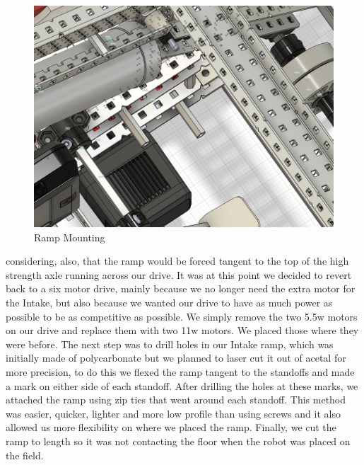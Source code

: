 \begin{figure}[H]
    \centering
    \includegraphics[width=0.5\linewidth]{images/tangentCAD.png}
    \caption{Ramp Mounting}
\end{figure}
considering, also, that the ramp would be forced tangent to the top of the high strength axle running across our drive. It was at this point we decided to revert back to a six motor drive, mainly because we no longer need the extra motor for the Intake, but also because we wanted our drive to have as much power as possible to be as competitive as possible. We simply remove the two 5.5w motors on our drive and replace them with two 11w motors. We placed those where they were before. The next step was to drill holes in our Intake ramp, which was initially made of polycarbonate but we planned to laser cut it out of acetal for more precision, to do this we flexed the ramp tangent to the standoffs and made a mark on either side of each standoff. After drilling the holes at these marks, we attached the ramp using zip ties that went around each standoff. This method was easier, quicker, lighter and more low profile than using screws and it also allowed us more flexibility on where we placed the ramp. Finally, we cut the ramp to length so it was not contacting the floor when the robot was placed on the field. 

